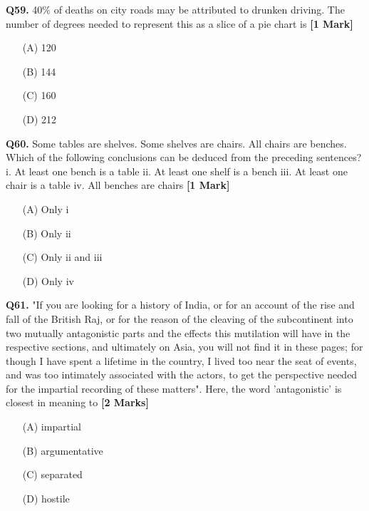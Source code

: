 \documentclass[11pt]{article}
\newcommand{\questiona}[2]{
    \noindent\textbf{Q#2.} #1 \hfill \textbf{[1 Mark]}
}
\newcommand{\questionb}[2]{
    \noindent\textbf{Q#2.} #1 \hfill \textbf{[2 Marks]}
}
\begin{document}
\questiona{40\% of deaths on city roads may be attributed to drunken driving. The number of degrees needed to represent this as a slice of a pie chart is}{59}
\begin{enumerate}
    \item[(A)] 120  
    \item[(B)] 144  
    \item[(C)] 160  
    \item[(D)] 212  
\end{enumerate}
\vspace{0.5cm}

\questiona{Some tables are shelves. Some shelves are chairs. All chairs are benches. Which of the following conclusions can be deduced from the preceding sentences? \newline
i. At least one bench is a table \newline
ii. At least one shelf is a bench \newline
iii. At least one chair is a table \newline
iv. All benches are chairs}{60}
\begin{enumerate}
    \item[(A)] Only i  
    \item[(B)] Only ii  
    \item[(C)] Only ii and iii  
    \item[(D)] Only iv  
\end{enumerate}
\vspace{0.5cm}

\questionb{"If you are looking for a history of India, or for an account of the rise and fall of the British Raj, or for the reason of the cleaving of the subcontinent into two mutually antagonistic parts and the effects this mutilation will have in the respective sections, and ultimately on Asia, you will not find it in these pages; for though I have spent a lifetime in the country, I lived too near the seat of events, and was too intimately associated with the actors, to get the perspective needed for the impartial recording of these matters". \newline
Here, the word 'antagonistic' is closest in meaning to}{61}
\begin{enumerate}
    \item[(A)] impartial  
    \item[(B)] argumentative  
    \item[(C)] separated  
    \item[(D)] hostile  
\end{enumerate}
\vspace{0.5cm}
\end{document}
